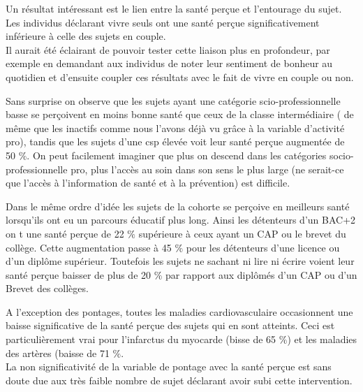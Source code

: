 \documentclass{book}
\begin{document}
\noindent
Un résultat intéressant est le lien entre la santé perçue et l'entourage du sujet. Les individus déclarant vivre seuls ont une santé perçue significativement inférieure à celle des sujets en couple.\\ Il aurait été éclairant de pouvoir tester cette liaison plus en profondeur, par exemple en demandant aux individus de noter leur sentiment de bonheur au quotidien et d'ensuite coupler ces résultats avec le fait de vivre en couple ou non.\\
\bigskip

\noindent
Sans surprise on observe que les sujets ayant une catégorie scio-professionnelle basse se perçoivent en moins bonne santé que ceux de la classe intermédiaire ( de même que les inactifs comme nous l'avons déjà vu grâce à la variable d'activité pro), tandis que les sujets d'une csp élevée voit leur santé perçue augmentée de 50 $\%$. On peut facilement imaginer que plus on descend dans les catégories socio-professionnelle pro, plus l'accès au soin dans son sens le plus large (ne serait-ce que l'accès à l'information de santé et à la prévention) est difficile.\\
\bigskip

\noindent
Dans le même ordre d'idée les sujets de la cohorte se perçoive en meilleurs santé lorsqu'ils ont eu un parcours éducatif plus long. Ainsi les détenteurs d'un BAC+2 on t une santé perçue de 22 $\%$ supérieure à ceux ayant un CAP ou le brevet du collège. Cette augmentation passe à 45 $\%$ pour les détenteurs d'une licence ou d'un diplôme supérieur. Toutefois les sujets ne sachant ni lire ni écrire voient leur santé perçue baisser de plus de 20 $\%$ par rapport aux diplômés d'un CAP ou d'un Brevet des collèges.\\
\bigskip

\noindent
A l'exception des pontages, toutes les maladies cardiovasculaire occasionnent une baisse significative de la santé perçue des sujets qui en sont atteints. Ceci est particulièrement vrai pour l'infarctus du myocarde (bisse de 65 $\%$) et les maladies des artères (baisse de 71 $\%$. \\
La non significativité de la variable de pontage avec la santé perçue est sans doute due aux très faible nombre de sujet déclarant avoir subi cette intervention.\\
\bigskip
\end{document}
